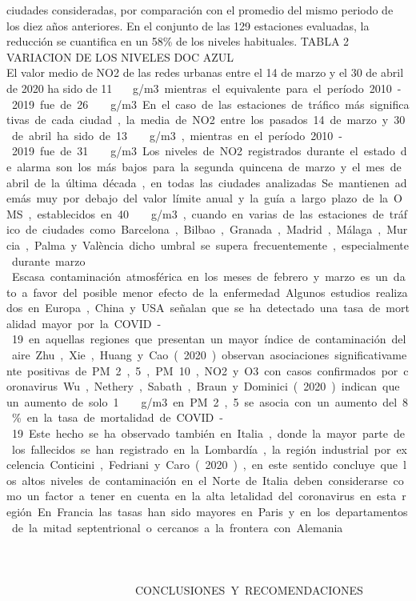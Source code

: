 \documentclass[a4paper,11pt]{article}
\begin{document}
ciudades consideradas, por comparación con el promedio del mismo periodo de los diez años
anteriores. En el conjunto de las 129 estaciones evaluadas, la reducción se cuantifica en un 58\%
de los niveles habituales.
TABLA 2 VARIACION DE LOS NIVELES DOC AZUL
\\ El valor medio de NO2 de las redes urbanas entre el 14 de marzo y el 30 de abril de 2020 ha sido de 11 \si\micro\ g/m3 mientras el equivalente para el período 2010-2019 fue de 26 \si\micro\ g/m3. En el caso de las estaciones de tráfico más significativas de cada ciudad, la media de NO2 entre los pasados 14 de marzo y 30 de abril ha sido de 13 \si\micro\ g/m3, mientras en el período 2010-2019 fue de 31 \si\micro\ g/m3.
Los niveles de NO2 registrados durante el estado de alarma son los más bajos para la segunda
quincena de marzo y el mes de abril de la última década, en todas las ciudades analizadas.
Se mantienen además muy por debajo del valor límite anual y la guía a largo plazo de la OMS,
establecidos en 40 \si\micro\ g/m3, cuando en varias de las estaciones de tráfico de ciudades como
Barcelona, Bilbao, Granada, Madrid, Málaga, Murcia, Palma y València dicho umbral se supera
frecuentemente, especialmente durante marzo.
\\ Escasa contaminación atmosférica  en los meses de febrero y marzo es un dato a favor del posible menor efecto de la enfermedad.
Algunos estudios realizados en Europa, China y USA señalan que se ha detectado una tasa de mortalidad
mayor por la COVID-19 en aquellas regiones que presentan un mayor índice de contaminación del
aire. Zhu, Xie, Huang y Cao (2020) observan asociaciones significativamente positivas de PM 2,5, PM 10,
NO2 y O3 con casos confirmados por coronavirus. Wu, Nethery, Sabath, Braun y Dominici (2020) indican
que un aumento de solo 1 \si\micro\ g/m3 en PM 2,5 se asocia con un aumento del 8\% en la tasa de mortalidad de
COVID-19. Este hecho se ha observado también en Italia, donde la mayor parte de los fallecidos se han
registrado en la Lombardía, la región industrial por excelencia. Conticini, Fedriani y Caro (2020), en este
sentido concluye que los altos niveles de contaminación en el Norte de Italia deben considerarse como un
factor a tener en cuenta en la alta letalidad del coronavirus en esta región. En Francia las tasas han sido
mayores en Paris y en los departamentos de la mitad septentrional o cercanos a la frontera con Alemania.
\ \ \ \ \ \ \ \ \ \ \ \ \ \ \   \ \ \ \ \ \ \\ \ \ \ \ \ \ \ \ \ \ \ \ \ \   \ \ \ \ \ \ \\ \ \ \ \ \ \ \ \ \ \ \ \ \ \   \ \ \ \ \ \ \\ \ \ \ \ \ \ \ \ \ \ \ CONCLUSIONES Y RECOMENDACIONES
\end{document}
